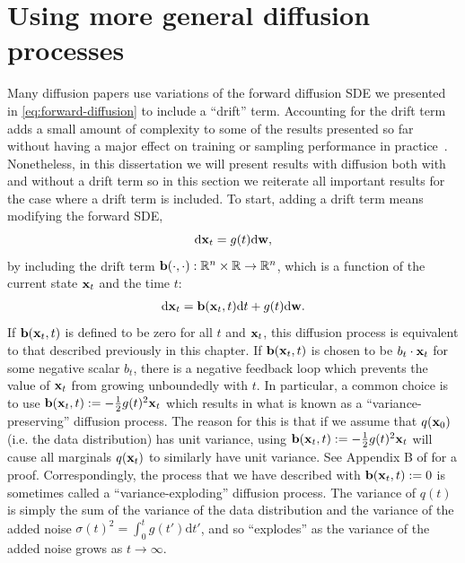 \section{Using more general diffusion processes} \label{sec:more-general-diffusion-processes}
Many diffusion papers use variations of the forward diffusion SDE we presented in \cref{eq:forward-diffusion} to include a ``drift'' term. Accounting for the drift term adds a small amount of complexity to some of the results presented so far without having a major effect on training or sampling performance in practice~\citep{karras2022elucidating}. Nonetheless, in this dissertation we will present results with diffusion both with and without a drift term so in this section we reiterate all important results for the case where a drift term is included. To start, adding a drift term means modifying the forward SDE,
\begin{equation}
    \mathrm{d}{\mathbf{x}}_t = g(t) \mathrm{d}{\mathbf{w}},
\end{equation}
by including the drift term ${\mathbf{b}}(\cdot, \cdot): \mathbb{R}^n \times \mathbb{R} \rightarrow \mathbb{R}^n$, which is a function of the current state ${\mathbf{x}}_t$ and the time $t$:
\begin{align} \label{eq:forward-diffusion-with-drift}
    \mathrm{d}{\mathbf{x}}_t = {\mathbf{b}}({\mathbf{x}}_t, t) \mathrm{d}t + g(t) \mathrm{d}{\mathbf{w}}.
\end{align}
If ${\mathbf{b}}({\mathbf{x}}_t, t)$ is defined to be zero for all $t$ and ${\mathbf{x}}_t$, this diffusion process is equivalent to that described previously in this chapter. If ${\mathbf{b}}({\mathbf{x}}_t, t)$ is chosen to be $b_t \cdot {\mathbf{x}}_t$ for some negative scalar $b_t$, there is a negative feedback loop which prevents the value of ${\mathbf{x}}_t$ from growing unboundedly with $t$. In particular, a common choice is to use ${\mathbf{b}}({\mathbf{x}}_t, t) := - \frac{1}{2}g(t)^2{\mathbf{x}}_t$ which results in what is known as a ``variance-preserving'' diffusion process. The reason for this is that if we assume that $q({\mathbf{x}}_0)$ (i.e. the data distribution) has unit variance, using ${\mathbf{b}}({\mathbf{x}}_t, t) := - \frac{1}{2}g(t)^2{\mathbf{x}}_t$ will cause all marginals $q({\mathbf{x}}_t)$ to similarly have unit variance. See Appendix B of \citet{song2020score} for a proof. Correspondingly, the process that we have described with ${\mathbf{b}}({\mathbf{x}}_t, t) := 0$ is sometimes called a ``variance-exploding'' diffusion process. The variance of $q(t)$ is simply the sum of the variance of the data distribution and the variance of the added noise $\sigma(t)^2 = \int_0^t g(t') \mathrm{d}t'$, and so ``explodes'' as the variance of the added noise grows as $t \rightarrow \infty$.

